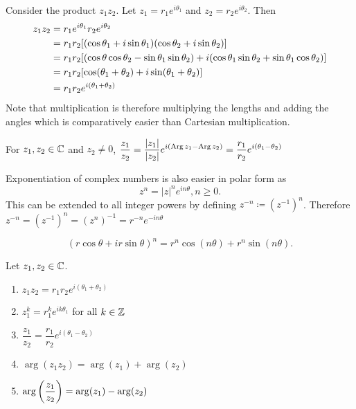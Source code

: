 \documentclass[../notes.tex]{subfiles}
\begin{document}
\begin{example}
    Consider the product $z_1 z_2$. Let $z_1 = r_1 e^{i \theta_1}$ and $z_2 = r_2 e^{i \theta_2}$. Then
    \begin{align*}
        z_1 z_2 &= r_1 e^{i \theta_1} r_2 e^{i \theta_2} \\
                &= r_1 r_2 \qty[(\cos \theta_1 + i \sin \theta_1)(\cos \theta_2 + i \sin \theta_2)] \\
                &= r_1 r_2 \qty[(\cos \theta \cos \theta_2 - \sin \theta_1 \sin \theta_2) + i (\cos \theta_1 \sin \theta_2 + \sin \theta_1 \cos \theta_2)] \\
                &= r_1 r_2 \qty[\cos(\theta_1 + \theta_2) + i \sin(\theta_1 + \theta_2)] \\
                &= r_1 r_2 e^{i (\theta_1 + \theta_2)}
    \end{align*}
    Note that multiplication is therefore multiplying the lengths and adding the angles which is comparatively easier than Cartesian multiplication.
    \begin{remark}
        For $z_1, z_2 \in \mathbb{C}$ and $z_2 \neq 0$, $\displaystyle \frac{z_1}{z_2} = \frac{|z_1|}{|z_2|} e^{i (\operatorname{Arg} z_1 - \operatorname{Arg} z_2)} = \frac{r_1}{r_2} e^{i(\theta_1 - \theta_2)}$
    \end{remark}
\end{example}

Exponentiation of complex numbers is also easier in polar form as
\[
    z^n = |z|^n e^{i n \theta}, n \geq 0
.\]
This can be extended to all integer powers by defining $z^{-n} \coloneq (z^{-1})^n$. Therefore $z^{-n} = (z^{-1})^n = (z^n)^{-1} = r^{-n} e^{-in \theta}$

\begin{theorem}
    \label{thm:demoivre}
    \[
        (r \cos \theta + i r \sin \theta)^n = r^n \cos(n \theta) + r^n \sin(n \theta)
    .\]
\end{theorem}

\begin{theorem}
    \label{thm:propsproductsandpowers}
    Let $z_1, z_2 \in \mathbb{C}$.
    \begin{enumerate}
        \item $z_1 z_2 = r_1 r_2 e^{i (\theta_1 + \theta_2)}$
        \item $z_1^k = r_1^k e^{i k \theta_1}$ for all $k \in \mathbb{Z}$
        \item $\dfrac{z_1}{z_2} = \dfrac{r_1}{r_2} e^{i(\theta_1 - \theta_2)}$
        \item $\arg(z_1 z_2) = \arg(z_1) + \arg(z_2)$
        \item $\arg\qty(\dfrac{z_1}{z_2}) = \arg(z_1) - \arg(z_2)$
    \end{enumerate}
\end{theorem}
\end{document}
